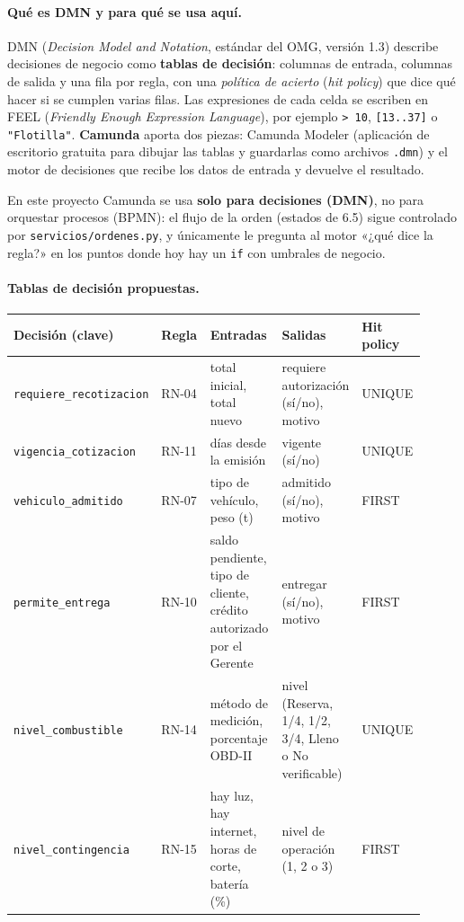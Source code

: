 
\paragraph{Qué es DMN y para qué se usa aquí.} DMN (\emph{Decision Model and Notation}, estándar del
OMG, versión 1.3) describe decisiones de negocio como \textbf{tablas de decisión}: columnas de entrada,
columnas de salida y una fila por regla, con una \emph{política de acierto} (\emph{hit policy}) que dice qué
hacer si se cumplen varias filas. Las expresiones de cada celda se escriben en FEEL (\emph{Friendly
Enough Expression Language}), por ejemplo \texttt{> 10}, \texttt{[13..37]} o
\texttt{"Flotilla"}. \textbf{Camunda} aporta dos piezas: Camunda Modeler (aplicación de escritorio
gratuita para dibujar las tablas y guardarlas como archivos \texttt{.dmn}) y el motor de decisiones que
recibe los datos de entrada y devuelve el resultado.

En este proyecto Camunda se usa \textbf{solo para decisiones (DMN)}, no para orquestar procesos (BPMN): el
flujo de la orden (estados de 6.5) sigue controlado por \texttt{servicios/ordenes.py}, y únicamente le
pregunta al motor «¿qué dice la regla?» en los puntos donde hoy hay un \texttt{if} con umbrales de negocio.

\paragraph{Tablas de decisión propuestas.}

{\small
\begin{longtable}{@{}L{0.2\linewidth}L{0.14\linewidth}L{0.22\linewidth}L{0.18\linewidth}L{0.17\linewidth}@{}}
\toprule
\textbf{Decisión (clave)} & \textbf{Regla} & \textbf{Entradas} & \textbf{Salidas} & \textbf{Hit policy} \\
\midrule
\endhead
\bottomrule
\endlastfoot
\texttt{requiere\_recotizacion} & RN-04 & total inicial, total nuevo & requiere autorización (sí/no),
motivo & UNIQUE \\
\texttt{vigencia\_cotizacion} & RN-11 & días desde la emisión & vigente (sí/no) & UNIQUE \\
\texttt{vehiculo\_admitido} & RN-07 & tipo de vehículo, peso (t) & admitido (sí/no), motivo & FIRST \\
\texttt{permite\_entrega} & RN-10 & saldo pendiente, tipo de cliente, crédito autorizado por el Gerente &
entregar (sí/no), motivo & FIRST \\
\texttt{nivel\_combustible} & RN-14 & método de medición, porcentaje OBD-II & nivel (Reserva, 1/4, 1/2,
3/4, Lleno o No verificable) & UNIQUE \\
\texttt{nivel\_contingencia} & RN-15 & hay luz, hay internet, horas de corte, batería (\%) & nivel de
operación (1, 2 o 3) & FIRST \\
\end{longtable}
}

